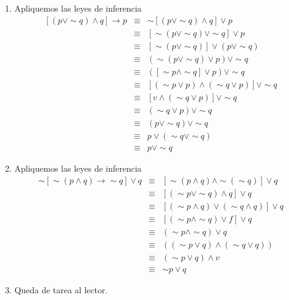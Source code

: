\solucion
\begin{enumerate}
\item Apliquemos las leyes de inferencia 
\begin{eqnarray*}
\left[\left(p\vee\sim q\right)\wedge q\right]\rightarrow p & \equiv & \sim\left[\left(p\vee\sim q\right)\wedge q\right]\vee p\\
 & \equiv & \left[\sim\left(p\vee\sim q\right)\vee\sim q\right]\vee p\\
 & \equiv & \left[\sim\left(p\vee\sim q\right)\right]\vee\left(p\vee\sim q\right)\\
 & \equiv & \left(\sim\left(p\vee\sim q\right)\vee p\right)\vee\sim q\\
 & \equiv & \left(\left[\sim p\wedge\sim q\right]\vee p\right)\vee\sim q\\
 & \equiv & \left[\left(\sim p\vee p\right)\wedge\left(\sim q\vee p\right)\right]\vee\sim q\\
 & \equiv & \left[v\wedge\left(\sim q\vee p\right)\right]\vee\sim q\\
 & \equiv & \left(\sim q\vee p\right)\vee\sim q\\
 & \equiv & \left(p\vee\sim q\right)\vee\sim q\\
 & \equiv & p\vee\left(\sim q\vee\sim q\right)\\
 & \equiv & p\vee\sim q
\end{eqnarray*}

\item Apliquemos las leyes de inferencia
\begin{eqnarray*}
\sim\left[\sim\left(p\wedge q\right)\rightarrow\sim q\right]\vee q & \equiv & \left[\sim\left(p\wedge q\right)\wedge\sim\left(\sim q\right)\right]\vee q\\
 & \equiv & \left[\left(\sim p\vee\sim q\right)\wedge q\right]\vee q\\
 & \equiv & \left[\left(\sim p\wedge q\right)\vee\left(\sim q\wedge q\right)\right]\vee q\\
 & \equiv & \left[\left(\sim p\wedge\sim q\right)\vee f\right]\vee q\\
 & \equiv & \left(\sim p\wedge\sim q\right)\vee q\\
 & \equiv & \left(\left(\sim p\vee q\right)\wedge\left(\sim q\vee q\right)\right)\\
 & \equiv & \left(\sim p\vee q\right)\wedge v\\
 & \equiv & \sim p\vee q
\end{eqnarray*}

\item Queda de tarea al lector.
\end{enumerate}

